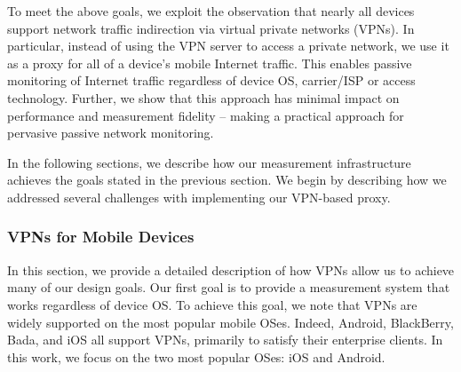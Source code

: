

To meet the above goals, we exploit the observation that nearly all 
devices support network traffic indirection via virtual private networks (VPNs). 
In particular, instead of using the VPN server to access a private network, 
we use it as a proxy for all of a device's mobile Internet traffic. This enables passive monitoring 
of Internet traffic regardless of device OS, carrier/ISP or access technology. 
Further, we show that this approach has minimal impact on 
performance and measurement fidelity -- making \platname{} a practical 
approach for pervasive passive network monitoring.

In the following sections, we describe how our measurement infrastructure 
achieves the goals stated in the previous section. We begin by describing 
how we addressed several challenges with implementing our VPN-based 
proxy. 



\subsubsection{VPNs for Mobile Devices}
\label{sec:vpn-tech-mobile-device}
In this section, we provide a detailed description of how VPNs allow 
us to achieve many of our \platname{} design goals.  
Our first goal is to provide a measurement system that works regardless 
of device OS. To achieve this goal, we note that VPNs are widely supported 
on the most popular mobile OSes. Indeed, Android, BlackBerry, Bada, and iOS all support VPNs,
primarily to satisfy their enterprise clients. In this work, we focus on 
the two most popular OSes: iOS and Android. 

